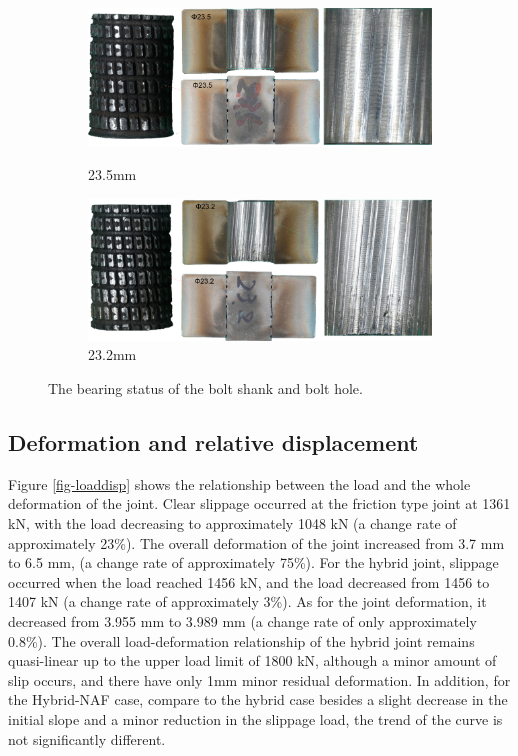 \begin{figure}
\centering
\begin{subfigure}[t]{0.9\textwidth}
    \centering
    \includegraphics[width=\textwidth]{imgs/ch6/bstatus-23-5.pdf}
    \label{fig-bstatus235}
    \caption{23.5mm}
\end{subfigure}
\hfill
\begin{subfigure}[t]{0.9\textwidth}
    \centering
    \includegraphics[width=\textwidth]{imgs/ch6/bstatus-23-2.pdf}
    \caption{23.2mm}
\end{subfigure}
\caption{The bearing status of the bolt shank and bolt hole.}
\label{fig-bcrossec}
\end{figure}


\subsection{Deformation and relative displacement}

Figure \ref{fig-loaddisp} shows the relationship between the load and the whole deformation of the joint. Clear slippage occurred at the friction type joint at 1361 kN, with the load decreasing to approximately 1048 kN (a change rate of approximately 23\%). The overall deformation of the joint increased from 3.7 mm to 6.5 mm, (a change rate of approximately 75\%). For the hybrid joint, slippage occurred when the load reached 1456 kN, and the load decreased from 1456 to 1407 kN (a change rate of approximately 3\%). As for the joint deformation, it decreased from 3.955 mm to 3.989 mm (a change rate of only approximately 0.8\%). The overall load-deformation relationship of the hybrid joint remains quasi-linear up to the upper load limit of 1800 kN, although a minor amount of slip occurs, and there have only 1mm minor residual deformation. In addition, for the Hybrid-NAF case, compare to the hybrid case besides a slight decrease in the initial slope and a minor reduction in the slippage load, the trend of the curve is not significantly different.

